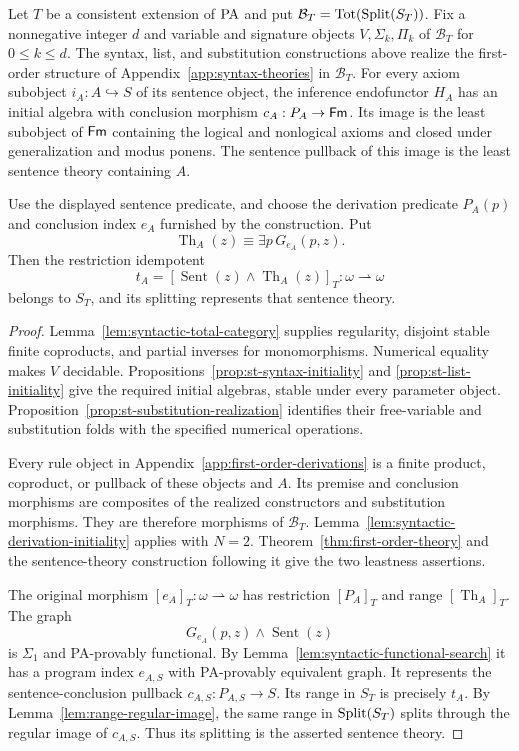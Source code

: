 \begin{theorem}\label{thm:syntactic-generated-theory}
Let $T$ be a consistent extension of $\mathrm{PA}$ and put
$\mathcal B_T=\operatorname{Tot}(\operatorname{Split}(S_T))$. Fix a nonnegative integer $d$
and variable and signature objects $V,\Sigma_k,\Pi_k$ of
$\mathcal B_T$ for $0\leq k\leq d$.
The syntax, list, and substitution constructions above realize
the first-order structure of Appendix~\ref{app:syntax-theories}
in $\mathcal B_T$. For every axiom subobject $i_A:A\hookrightarrow S$
of its sentence object, the inference endofunctor $H_A$ has an
initial algebra with conclusion morphism $c_A:P_A\to\mathsf{Fm}$.
Its image is the least subobject of $\mathsf{Fm}$ containing the logical
and nonlogical axioms and closed under generalization and modus
ponens. The sentence pullback of this image is the least sentence
theory containing $A$.

Use the displayed sentence predicate, and choose the derivation
predicate $P_A(p)$ and conclusion index $e_A$ furnished by the
construction. Put
\[
 \operatorname{Th}_A(z)\equiv\exists p\,G_{e_A}(p,z).
\]
Then the restriction idempotent
\[
 t_A=[\operatorname{Sent}(z)\land\operatorname{Th}_A(z)]_T:
                  \omega\rightharpoonup\omega
\]
belongs to $S_T$, and its splitting represents that sentence theory.
\end{theorem}
\begin{proof}
Lemma~\ref{lem:syntactic-total-category} supplies regularity,
disjoint stable finite coproducts, and partial inverses for
monomorphisms. Numerical equality makes $V$ decidable.
Propositions~\ref{prop:st-syntax-initiality} and
\ref{prop:st-list-initiality} give the required initial algebras,
stable under every parameter object.
Proposition~\ref{prop:st-substitution-realization} identifies
their free-variable and substitution folds with the specified
numerical operations.

Every rule object in Appendix~\ref{app:first-order-derivations}
is a finite product, coproduct, or pullback of these objects and
$A$. Its premise and conclusion morphisms are composites of the
realized constructors and substitution morphisms. They are
therefore morphisms of $\mathcal B_T$.
Lemma~\ref{lem:syntactic-derivation-initiality} applies with $N=2$.
Theorem~\ref{thm:first-order-theory} and the sentence-theory
construction following it give the two leastness assertions.

The original morphism $[e_A]_T:\omega\rightharpoonup\omega$
has restriction $[P_A]_T$ and range $[\operatorname{Th}_A]_T$.
The graph
\[
 G_{e_A}(p,z)\land\operatorname{Sent}(z)
\]
is $\Sigma_1$ and PA-provably functional. By
Lemma~\ref{lem:syntactic-functional-search} it has a program
index $e_{A,S}$ with PA-provably equivalent graph.
It represents the sentence-conclusion pullback
$c_{A,S}:P_{A,S}\to S$. Its range in $S_T$ is precisely $t_A$.
By Lemma~\ref{lem:range-regular-image}, the same range in
$\operatorname{Split}(S_T)$ splits through the regular image of $c_{A,S}$.
Thus its splitting is the asserted sentence theory.
\end{proof}

